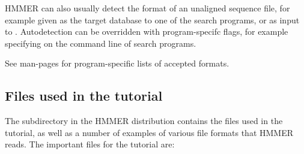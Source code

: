 HMMER can also usually detect the format of an unaligned  
sequence file, for example given as the target database to one of the search
programs, or as input to . Autodetection can be overridden with
program-specifc flags, for example specifying  on
the command line of search programs.

See man-pages for program-specific lists of accepted formats. 

 

\subsection{Files used in the tutorial}

The subdirectory  in the HMMER distribution contains the
files used in the tutorial, as well as a number of examples of various
file formats that HMMER reads. The important files for the tutorial
are:

